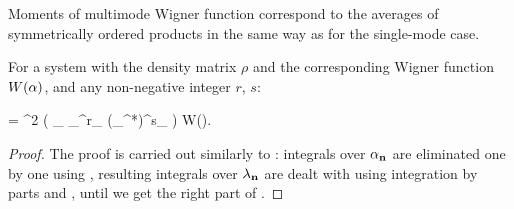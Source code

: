 Moments of multimode Wigner function correspond to the averages of symmetrically ordered products in the same way as for the single-mode case.

\begin{theorem}
	For a system with the density matrix $\rho$ and the corresponding Wigner function $W(\mathbf{\alpha})$, and any non-negative integer $r$, $s$:
	\begin{eqn*}
		\langle {} \rangle
		= \int \upd^2 \balpha
			\left(
				\prod_{\nvec \in \restbasis} \alpha_{\nvec}^{r_{\nvec}} (\alpha_{\nvec}^*)^{s_{\nvec}}
			\right) W(\balpha).
	\end{eqn*}
\end{theorem}
\begin{proof}
The proof is carried out similarly to : integrals over $\alpha_{\mathbf{n}}$ are eliminated one by one using , resulting integrals over $\lambda_{\mathbf{n}}$ are dealt with using integration by parts and , until we get the right part of .
\end{proof}
